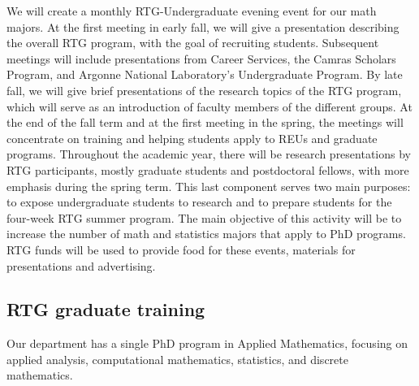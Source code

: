 \documentclass[11pt]{NSFamsart}
\begin{document}
We will create a monthly RTG-Undergraduate evening event for our   math majors. At the first meeting in early fall,
we will give a presentation describing the overall RTG program, with the goal of recruiting students.
Subsequent meetings will include presentations from   Career  Services, the Camras Scholars
Program, and    Argonne National Laboratory's Undergraduate Program. By late fall, we will give brief presentations of the
research topics of the RTG program, which will serve as an introduction of faculty members of the different
groups. At the end of the fall term and at the first meeting in the spring, the meetings will concentrate on
training and helping students apply to REUs and graduate programs. Throughout the academic year, there
will be research presentations by RTG participants, mostly graduate students and postdoctoral fellows, with
more emphasis during the spring term. This last component serves two main purposes: to expose undergraduate
students to research and to prepare students for the four-week RTG summer program. The main
objective of this activity will be to increase the number of math and statistics majors that apply to PhD programs.
RTG funds will be used to provide food for these events, materials for presentations and advertising.

\iffalse
Our Interprofessional Projects (IPRO) Program provides the alternative to a traditional undergraduate education. Our signature IPRO Program remains one of just a few programs of its kind in the country. IPRO joins students from various majors to work together to solve real-world problems, often on behalf of sponsor companies and nonprofits. A required academic program, IPRO teaches leadership, creativity, teamwork, design thinking, and project management, uniquely preparing students to succeed in a professional work environment. Our department offers a recurring IPRO equivalent (an ``I Course'', taught as MATH 497) which has a special focus on techniques from mathematics and statistics.  Moreover, the  Pritzker Institute of Biomedical Science and Engineering provides a limited number of research stipends for undergraduate math majors to conduct research in biophysical modeling. 
\fi



\subsection{RTG graduate training }

 
Our department has a single PhD program in Applied  Mathematics, focusing    on applied analysis,     computational mathematics,    statistics, and discrete mathematics. 
\end{document}
